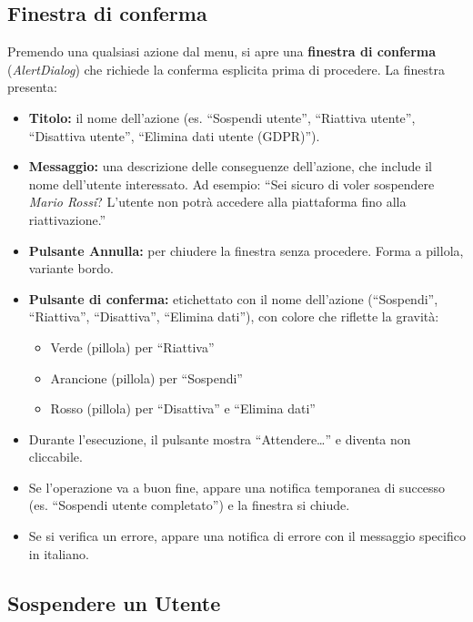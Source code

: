 \documentclass[a4paper,11pt,oneside]{book}
\begin{document}
\subsection{Finestra di conferma}

Premendo una qualsiasi azione dal menu, si apre una \textbf{finestra di conferma} (\textit{AlertDialog}) che richiede la conferma esplicita prima di procedere. La finestra presenta:

\begin{itemize}[leftmargin=1.5em]
  \item \textbf{Titolo:} il nome dell'azione (es. ``Sospendi utente'', ``Riattiva utente'', ``Disattiva utente'', ``Elimina dati utente (GDPR)'').
  \item \textbf{Messaggio:} una descrizione delle conseguenze dell'azione, che include il nome dell'utente interessato. Ad esempio: ``Sei sicuro di voler sospendere \textit{Mario Rossi}? L'utente non potr\`a accedere alla piattaforma fino alla riattivazione.''
  \item \textbf{Pulsante Annulla:} per chiudere la finestra senza procedere. Forma a pillola, variante bordo.
  \item \textbf{Pulsante di conferma:} etichettato con il nome dell'azione (``Sospendi'', ``Riattiva'', ``Disattiva'', ``Elimina dati''), con colore che riflette la gravit\`a:
    \begin{itemize}
      \item \textcolor{namoGreen}{Verde} (pillola) per ``Riattiva''
      \item \textcolor{namoOrange}{Arancione} (pillola) per ``Sospendi''
      \item \textcolor{namoRed}{Rosso} (pillola) per ``Disattiva'' e ``Elimina dati''
    \end{itemize}
  \item Durante l'esecuzione, il pulsante mostra ``Attendere\ldots'' e diventa non cliccabile.
  \item Se l'operazione va a buon fine, appare una notifica temporanea di successo (es. ``Sospendi utente completato'') e la finestra si chiude.
  \item Se si verifica un errore, appare una notifica di errore con il messaggio specifico in italiano.
\end{itemize}

\subsection{Sospendere un Utente}
\label{sec:sospendere-utente}
\end{document}
